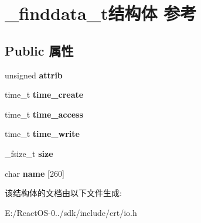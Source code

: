 \hypertarget{struct__finddata__t}{}\section{\+\_\+finddata\+\_\+t结构体 参考}
\label{struct__finddata__t}
\subsection*{Public 属性}
\begin{DoxyCompactItemize}
\item 
\mbox{\label{struct__finddata__t_a5d4fe2ccda1473978e72cdd6a50e798e}} 
unsigned {\bfseries attrib}
\item 
\mbox{\label{struct__finddata__t_a7e72ddede53040030ab778b47505416c}} 
time\+\_\+t {\bfseries time\+\_\+create}
\item 
\mbox{\label{struct__finddata__t_a0941ce05814cb753f2d16cb8046ae106}} 
time\+\_\+t {\bfseries time\+\_\+access}
\item 
\mbox{\label{struct__finddata__t_a53240c8ccf5d64d163ad9699d6569e78}} 
time\+\_\+t {\bfseries time\+\_\+write}
\item 
\mbox{\label{struct__finddata__t_a7f1d52b3622883e5c6442a1a333d524f}} 
\+\_\+fsize\+\_\+t {\bfseries size}
\item 
\mbox{\label{struct__finddata__t_ab62c76a354d902fbc85b1fa238cf7bdb}} 
char {\bfseries name} \mbox{[}260\mbox{]}
\end{DoxyCompactItemize}


该结构体的文档由以下文件生成\+:\begin{DoxyCompactItemize}
\item 
E\+:/\+React\+O\+S-\/0../sdk/include/crt/io.\+h\end{DoxyCompactItemize}

